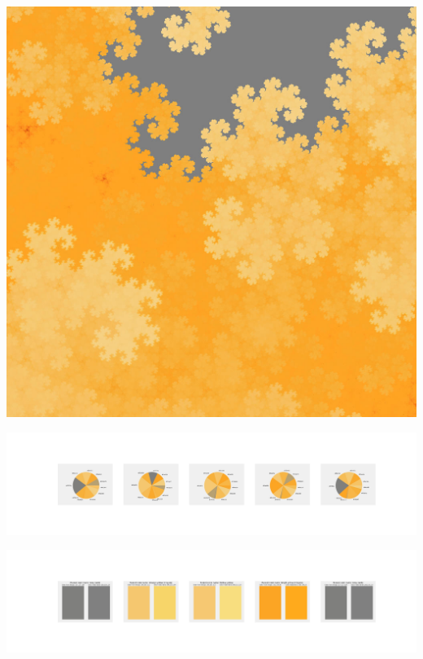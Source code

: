 \documentclass[11pt]{article}
\begin{document}
\begin{landscape}
    \begin{center}
    \includegraphics[width=\textwidth]{./nbimg/file (336).jpg}
    \end{center}

    \begin{center}
    \includegraphics[width=250mm]{./nbimg/pie-263.jpg}
    \end{center}

    \begin{center}
    \includegraphics[width=250mm]{./nbimg/peak-263.jpg}
    \end{center}
    


\end{landscape}
\end{document}
